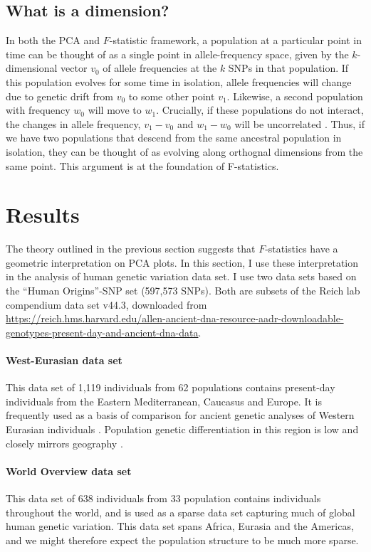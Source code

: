 \documentclass[12pt,a4pape, fullpage]{article}
\begin{document}
	
	
	\subsection{What is a dimension?}
	In both the PCA and $F$-statistic framework, a population at  a particular point in time can be thought of as a single point in allele-frequency space, given by the $k$-dimensional vector $v_0$ of allele frequencies at the $k$ SNPs in that population. If this population evolves for some time in isolation, allele frequencies will change due to genetic drift from $v_0$ to some other point $v_1$. Likewise, a second population with frequency $w_0$ will move to $w_1$. Crucially, if these populations do not interact, the changes in allele frequency, $v_1 - v_0$ and $w_1 - w_0$ will be uncorrelated \cite{patterson2012}. Thus, if we have two populations that descend from the same ancestral population in isolation, they can be thought of as evolving along orthognal dimensions from the same point. This argument is at the foundation of F-statistics.
	
	

\section{Results}
The theory outlined in the previous section suggests that $F$-statistics have a geometric interpretation on PCA plots. In this section, I use these interpretation in the analysis of human genetic variation data set. I use two data sets based on the ``Human Origins''-SNP set (597,573 SNPs). Both are subsets of the Reich lab compendium data set v44.3, downloaded from \url{https://reich.hms.harvard.edu/allen-ancient-dna-resource-aadr-downloadable-genotypes-present-day-and-ancient-dna-data}. 

\paragraph{West-Eurasian data set}
This data set of 1,119 individuals from 62 populations contains  present-day individuals from the Eastern Mediterranean, Caucasus and Europe. It is frequently used as a basis of comparison for ancient genetic analyses of Western Eurasian individuals \cite{patterson2012}. Population genetic differentiation in this region is low and closely mirrors geography \cite{novembre2008}. 

\paragraph{World Overview data set}
This data set of 638 individuals from 33 population contains individuals throughout the world, and is used as a sparse data set capturing much of global human genetic variation. This data set spans Africa, Eurasia and the Americas, and we might therefore expect the population structure to be much more sparse.
\end{document}
